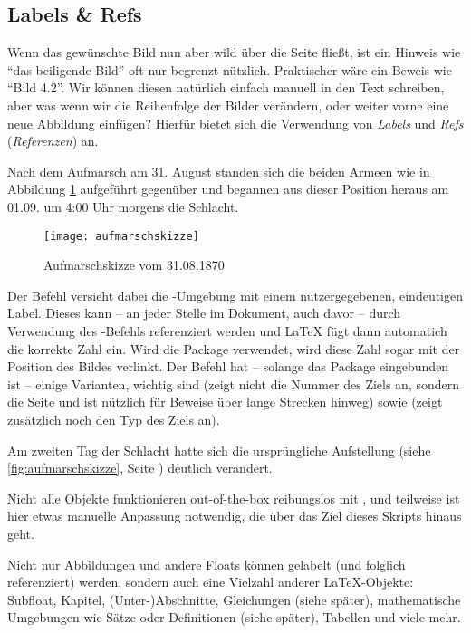 \subsection{Labels \& Refs}
Wenn das gewünschte Bild nun aber wild über die Seite fließt, ist ein Hinweis wie \enquote{das beiligende Bild} oft nur begrenzt nützlich.
Praktischer wäre ein Beweis wie \enquote{Bild 4.2}.
Wir können diesen natürlich einfach manuell in den Text schreiben, aber was wenn wir die Reihenfolge der Bilder verändern, oder weiter vorne eine neue Abbildung einfügen?
Hierfür bietet sich die Verwendung von \emph{Labels} und \emph{Refs} (\emph{Referenzen})  an.
\begin{latexlisting}
	Nach dem Aufmarsch am 31. August standen sich die beiden Armeen wie in Abbildung \ref{fig:aufmarschskizze} aufgeführt gegenüber und begannen aus dieser Position heraus am 01.09. um 4:00 Uhr morgens die Schlacht.

	\begin{figure}
		\texttt{[image: aufmarschskizze]}		
		\caption{Aufmarschskizze vom 31.08.1870}
		\label{fig:aufmarschskizze}
	\end{figure}
\end{latexlisting}
Der Befehl  versieht dabei die -Umgebung mit einem nutzergegebenen, eindeutigen Label.
Dieses kann -- an jeder Stelle im Dokument, auch davor -- durch Verwendung des -Befehls referenziert werden und \LaTeX{} fügt dann automatich die korrekte Zahl ein.
Wird die Package  verwendet, wird diese Zahl sogar mit der Position des Bildes verlinkt.
Der Befehl  hat -- solange das Package  eingebunden ist -- einige Varianten, wichtig sind  (zeigt nicht die Nummer des Ziels an, sondern die Seite und ist nützlich für Beweise über lange Strecken hinweg) sowie  (zeigt zusätzlich noch den Typ des Ziels an).
\begin{latexlisting}
	Am zweiten Tag der Schlacht hatte sich die ursprüngliche Aufstellung (siehe \autoref{fig:aufmarschskizze}, Seite \pageref{fig:aufmarschskizze}) deutlich verändert.
\end{latexlisting}
Nicht alle Objekte funktionieren out-of-the-box reibungslos mit , und teilweise ist hier etwas manuelle Anpassung notwendig, die über das Ziel dieses Skripts hinaus geht.

Nicht nur Abbildungen und andere Floats können gelabelt (und folglich referenziert) werden, sondern auch eine Vielzahl anderer \LaTeX{}-Objekte: Subfloat, Kapitel, (Unter-)Abschnitte, Gleichungen (siehe später), mathematische Umgebungen wie Sätze oder Definitionen (siehe später), Tabellen und viele mehr. 


